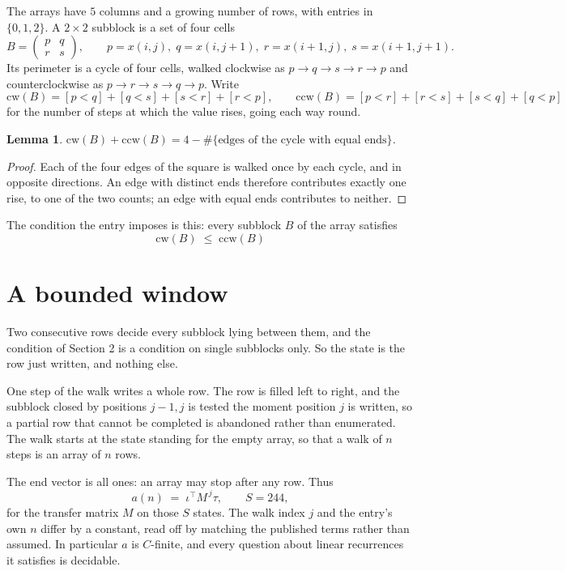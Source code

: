 \documentclass[11pt,a4paper]{article}
\theoremstyle{plain}
\newtheorem{lemma}[theorem]{Lemma}
\theoremstyle{definition}
\begin{document}
The arrays have $5$ columns and a growing number of rows, with entries in $\{0,1,2\}$. A
$2\times2$ subblock is a set of four cells
\[
B=\begin{pmatrix} p & q \\ r & s \end{pmatrix},
\qquad p=x(i,j),\; q=x(i,j+1),\; r=x(i+1,j),\; s=x(i+1,j+1).
\]
Its perimeter is a cycle of four cells, walked clockwise as $p\to q\to s\to r\to p$ and
counterclockwise as $p\to r\to s\to q\to p$. Write
\[
\mathrm{cw}(B)=[p<q]+[q<s]+[s<r]+[r<p],\qquad
\mathrm{ccw}(B)=[p<r]+[r<s]+[s<q]+[q<p]
\]
for the number of steps at which the value rises, going each way round.

\begin{lemma}\label{lem:sum}
$\mathrm{cw}(B)+\mathrm{ccw}(B)=4-\#\{\text{edges of the cycle with equal ends}\}$.
\end{lemma}

\begin{proof}
Each of the four edges of the square is walked once by each cycle, and in opposite directions.
An edge with distinct ends therefore contributes exactly one rise, to one of the two counts;
an edge with equal ends contributes to neither.
\end{proof}

The condition the entry imposes is this: every subblock $B$ of the array satisfies
\[
\mathrm{cw}(B)\;\le\;\mathrm{ccw}(B)
\]


\section{A bounded window}

Two consecutive rows decide every subblock lying between them, and the condition of Section 2 is a condition on single subblocks only. So the state is the row just written, and nothing else.

One step of the walk writes a whole row. The row is filled left to right, and the subblock
closed by positions $j-1,j$ is tested the moment position $j$ is written, so a partial row that
cannot be completed is abandoned rather than enumerated. The walk starts at the state standing
for the empty array, so that a walk of $n$ steps is an array of $n$ rows.

The end vector is all ones: an array may stop after any row. Thus
\[
a(n)\;=\;\iota^{\!\top}M^{\,j}\tau ,\qquad S=244,
\]
for the transfer matrix $M$ on those $S$ states. The walk index $j$ and the entry's own $n$
differ by a constant, read off by matching the published terms rather than assumed. In
particular $a$ is $C$-finite, and every question about linear recurrences it satisfies is
decidable.
\end{document}
